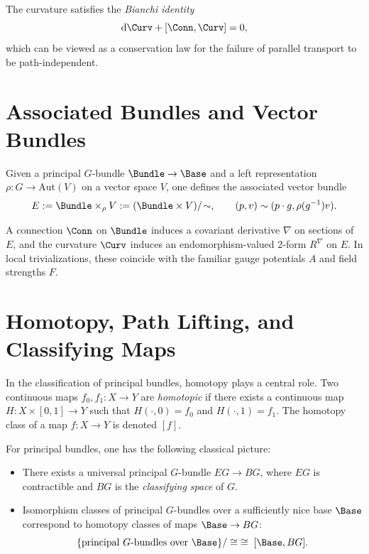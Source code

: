 \documentclass[11pt]{book}
\theoremstyle{plain}
\theoremstyle{definition}
\begin{document}
The curvature satisfies the \emph{Bianchi identity}
\[
  \mathrm{d}\Curv + [\Conn,\Curv] = 0,
\]
which can be viewed as a conservation law for the failure of
parallel transport to be path-independent.



\section{Associated Bundles and Vector Bundles}


Given a principal $G$-bundle $\Bundle\to\Base$ and a left
representation $\rho:G\to\mathrm{Aut}(V)$ on a vector space $V$, one
defines the associated vector bundle
\[
  E := \Bundle\times_\rho V
  :=
  (\Bundle\times V)/\!\sim,
  \qquad
  (p,v)\sim(p\cdot g,\rho(g^{-1})v).
\]



A connection $\Conn$ on $\Bundle$ induces a covariant derivative
$\nabla$ on sections of $E$, and the curvature $\Curv$ induces an
endomorphism-valued 2-form $R^\nabla$ on $E$. In local trivializations,
these coincide with the familiar gauge potentials $A$ and field
strengths $F$.



\section{Homotopy, Path Lifting, and Classifying Maps}


In the classification of principal bundles, homotopy plays a central
role. Two continuous maps $f_0,f_1:X\to Y$ are \emph{homotopic} if
there exists a continuous map $H:X\times[0,1]\to Y$ such that
$H(\cdot,0)=f_0$ and $H(\cdot,1)=f_1$. The homotopy class of a map
$f:X\to Y$ is denoted $[f]$.



For principal bundles, one has the following classical picture:

\begin{itemize}
  \item There exists a universal principal $G$-bundle
        $EG\to BG$, where $EG$ is contractible and $BG$ is the
        \emph{classifying space} of $G$.
  \item Isomorphism classes of principal $G$-bundles over a
        sufficiently nice base $\Base$ correspond to homotopy
        classes of maps $\Base\to BG$:
        \[
          \{\text{principal $G$-bundles over }\Base\}/\cong
          \;\cong\;
          [\Base,BG].
        \]
\end{itemize}
\end{document}
